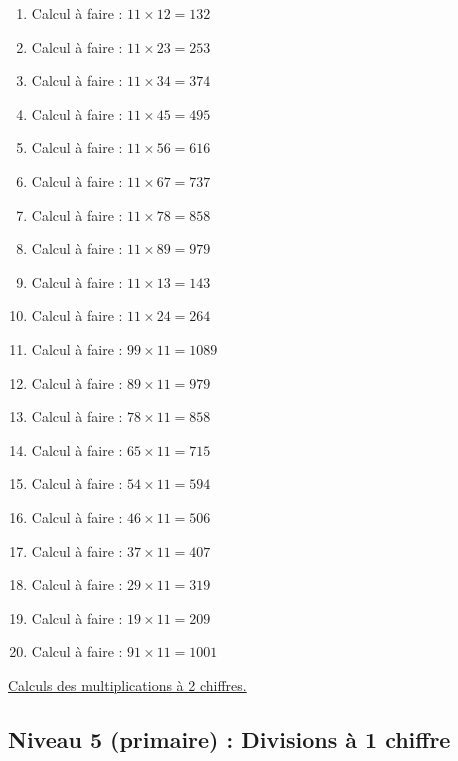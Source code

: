 \documentclass[11pt]{article}
\begin{document}
\begin{enumerate}
\item Calcul à faire :  \(11\times 12 =  132\)
\item Calcul à faire :  \(11\times 23 = 253\)
\item Calcul à faire :  \(11\times 34 = 374\)
\item Calcul à faire :  \(11\times 45 = 495\)
\item Calcul à faire :  \(11\times 56 = 616\)
\item Calcul à faire :  \(11\times 67 = 737\)
\item Calcul à faire :  \(11\times 78 =  858\)
\item Calcul à faire :  \(11\times 89 = 979\)
\item Calcul à faire :  \(11\times 13 = 143\)
\item Calcul à faire :  \(11\times 24 = 264\)
\item Calcul à faire :  \(99\times 11 = 1089\)
\item Calcul à faire :  \(89\times 11 = 979\)
\item Calcul à faire :  \(78\times 11 = 858\)
\item Calcul à faire :  \(65\times 11 = 715\)
\item Calcul à faire :  \(54\times 11 = 594\)
\item Calcul à faire :  \(46\times 11 = 506\)
\item Calcul à faire :  \(37\times 11 = 407\)
\item Calcul à faire :  \(29\times 11 = 319\)
\item Calcul à faire :  \(19\times 11 = 209\)
\item Calcul à faire :  \(91\times 11 = 1001\)
\end{enumerate}




\hyperref[org08e1fa7]{Calculs des multiplications à 2 chiffres.}





\newpage

\subsection{Niveau 5 (primaire) : Divisions à 1 chiffre}
\label{sec:orga9fa1a5}
\label{orge6753fe}
\end{document}
